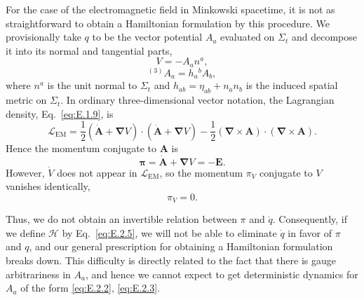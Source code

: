 For the case of the electromagnetic field in Minkowski spacetime, it is not as
straightforward to obtain a Hamiltonian formulation by this procedure. We
provisionally take \(q\) to be the vector potential \(A_a\) evaluated on \(\Sigma_t\)
and decompose it into its normal and tangential parts,
\begin{equation}
  V=-A_an^a,
  \tag{E.2.11}\label{eq:E.2.11}
\end{equation}
\begin{equation}
  {}^{(3)}A_a=h_a{}^bA_b,
  \tag{E.2.12}\label{eq:E.2.12}
\end{equation}
where \(n^a\) is the unit normal to \(\Sigma_t\) and
\(h_{ab}=\eta_{ab}+n_an_b\) is the induced spatial metric on \(\Sigma_t\). In
ordinary three-dimensional vector notation, the Lagrangian density,
Eq.~\eqref{eq:E.1.9}, is
\begin{equation}
  \mathcal L_{\mathrm{EM}}
    =\frac{1}{2}(\dot{\mathbf{A}}+\boldsymbol{\nabla} V)\cdot(\dot{\mathbf{A}}+\boldsymbol{\nabla} V)
      -\frac{1}{2}(\boldsymbol{\nabla}\times\mathbf{A})\cdot(\boldsymbol{\nabla}\times\mathbf{A}).
  \tag{E.2.13}\label{eq:E.2.13}
\end{equation}
Hence the momentum conjugate to \(\mathbf{A}\) is
\begin{equation}
  \boldsymbol{\pi}=\dot{\mathbf{A}}+\boldsymbol{\nabla} V=-\mathbf{E}.
  \tag{E.2.14}\label{eq:E.2.14}
\end{equation}
However, \(\dot V\) does not appear in \(\mathcal L_{\mathrm{EM}}\), so the momentum
\(\pi_V\) conjugate to \(V\) vanishes identically,
\begin{equation}
  \pi_V=0.
  \tag{E.2.15}\label{eq:E.2.15}
\end{equation}

Thus, we do not obtain an invertible relation between \(\pi\) and \(\dot q\).
Consequently, if we define \(\mathcal H\) by Eq.~\eqref{eq:E.2.5}, we will not be
able to eliminate \(\dot q\) in favor of \(\pi\) and \(q\), and our general
prescription for obtaining a Hamiltonian formulation breaks down. This difficulty is
directly related to the fact that there is gauge arbitrariness in \(A_a\), and hence
we cannot expect to get deterministic dynamics for \(A_a\) of the form
\eqref{eq:E.2.2}, \eqref{eq:E.2.3}.

